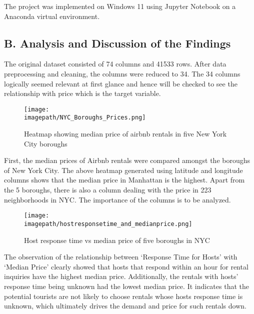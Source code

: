 \documentclass[conference]{IEEEtran}
\newcommand{\imagepath}{C:/Users/Lenovo/Desktop/SEM 6/BIG DATA/BIG_DATA_COURSEWORK/Images for Latex/}
\begin{document}
The project was implemented on Windows 11 using Jupyter Notebook on a Anaconda virtual environment. 

\subsection*{\centering B. Analysis and Discussion of the Findings}
The original dataset consisted of 74 columns and 41533 rows. After data preprocessing and cleaning, the columns were reduced to 34. The 34 columns logically seemed relevant at first glance and hence will be checked to see the relationship with price which is the target variable.\newline

\begin{figure}[H]
  \centering
  \texttt{[image: \\imagepath/NYC\_Boroughs\_Prices.png]}
  \caption{Heatmap showing median price of airbnb rentals in five New York City boroughs}
  \label{fig: your_label}
\end{figure}

First, the median prices of Airbnb rentals were compared amongst the boroughs of New York City. The above heatmap generated using latitude and longitude columns shows that the median price in Manhattan is the highest. Apart from the 5 boroughs, there is also a column dealing with the price in 223 neighborhoods in NYC. The importance of the columns is to be analyzed.\newline

\begin{figure}[H]
  \centering
  \texttt{[image: \\imagepath/hostresponsetime\_and\_medianprice.png]}
  \caption{Host response time vs median price of five boroughs in NYC}
  \label{fig: your_label}
\end{figure}

The observation of the relationship between ‘Response Time for Hosts’ with ‘Median Price’ clearly showed that hosts that respond within an hour for rental inquiries have the highest median price. Additionally, the rentals with hosts’ response time being unknown had the lowest median price. It indicates that the potential tourists are not likely to choose rentals whose hosts response time is unknown, which ultimately drives the demand and price for such rentals down.\newline
\end{document}

